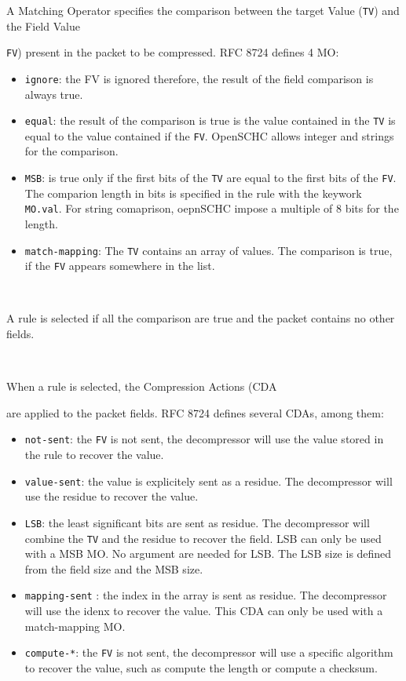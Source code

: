 A Matching Operator specifies the comparison between the target Value  (\texttt{TV}) and the Field Value {\texttt{FV}) present in the packet to be compressed. RFC 8724 defines 4 MO:

\begin{itemize}
\item \texttt{ignore}: the FV is ignored therefore, the result of the field comparison is always true.
\item \texttt{equal}: the result of the comparison is true is the value contained in the \texttt{TV} is equal to the value contained if the \texttt{FV}. OpenSCHC allows integer and strings for the comparison.
\item \texttt{MSB}: is true only if the first bits of the \texttt{TV} are equal to the first bits of the \texttt{FV}. The comparion length in bits is specified in the rule with the keywork \texttt{MO.val}. For string comaprison, oepnSCHC impose a  multiple of 8 bits for the length.
\item \texttt{match-mapping}: The \texttt{TV} contains an array of values. The comparison is true, if the \texttt{FV} appears somewhere in the list.
\end{itemize}

~

A rule is selected if all the comparison are true and the packet contains no other fields. 

~

When a rule is selected, the Compression Actions (CDA} are applied to the packet fields. RFC 8724 defines several CDAs, among them:

\begin{itemize}
\item \texttt{not-sent}: the \texttt{FV} is not sent, the decompressor will use the value stored in the rule to recover the value.
\item \texttt{value-sent}: the value is explicitely sent as a residue. The decompressor will use the residue to recover the value.
\item \texttt{LSB}: the least significant bits are sent as residue. The decompressor will combine the \texttt{TV} and the residue to recover the field. LSB can only be used with a MSB MO. No argument are needed for LSB. The LSB size is defined from the field size and the MSB size.
\item \texttt{mapping-sent} : the index in the array is sent as residue. The decompressor will use the idenx to recover the value. This CDA can only be used with a match-mapping MO.
\item \texttt{compute-*}: the \texttt{FV} is not sent, the decompressor will use a specific algorithm to recover the value, such as compute the length or compute a checksum.
\end{itemize}

